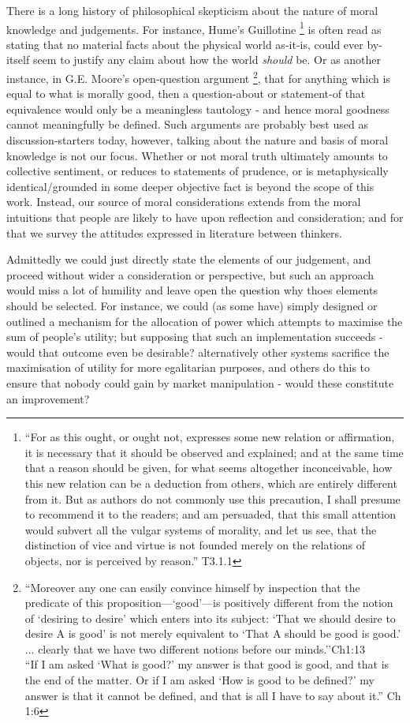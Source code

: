 \documentclass{article}
\begin{document}
There is a long history of philosophical skepticism about the nature of moral knowledge and judgements.
For instance, Hume's Guillotine \cite{HumeGutenberg}\footnote{``For as this ought, or ought not, expresses some new relation or affirmation, it is necessary that it should be observed and explained; and at the same time that a reason should be given, for what seems altogether inconceivable, how this new relation can be a deduction from others, which are entirely different from it. But as authors do not commonly use this precaution, I shall presume to recommend it to the readers; and am persuaded, that this small attention would subvert all the vulgar systems of morality, and let us see, that the distinction of vice and virtue is not founded merely on the relations of objects, nor is perceived by reason.'' T3.1.1} is often read as stating that no material facts about the physical world as-it-is, could ever by-itself seem to justify any claim about how the world \textit{should} be.
Or as another instance, in G.E. Moore's open-question argument \cite{MooreGutenberg}\footnote{
``Moreover any one can easily convince himself by inspection that the predicate of this proposition—`good'—is positively different from the notion of ‘desiring to desire' which enters into its subject: `That we should desire to desire A is good’ is not merely equivalent to `That A should be good is good.' ... clearly that we have two different notions before our minds.''Ch1:13\\
``If I am asked ‘What is good?’ my answer is that good is good, and that is the end of the matter. Or if I am asked ‘How is good to be defined?’ my answer is that it cannot be defined, and that is all I have to say about it.'' Ch 1:6}, that for anything which is equal to what is morally good, then a question-about or statement-of that equivalence would only be a meaningless tautology - and hence moral goodness cannot meaningfully be defined.
Such arguments are probably best used as discussion-starters today, however, talking about the nature and basis of moral knowledge is not our focus.
Whether or not moral truth ultimately amounts to collective sentiment, or reduces to  statements of prudence, or is metaphysically identical/grounded in some deeper objective fact is beyond the scope of this work.
Instead, our source of moral considerations extends from the moral intuitions that people are likely to have upon reflection and consideration; and for that we survey the attitudes expressed in literature between thinkers.

Admittedly we could just directly state the elements of our judgement, and proceed without wider a consideration or perspective, but such an approach would miss a lot of humility and leave open the question why thoes elements should be selected.
For instance, we could (as some have) simply designed or outlined a mechanism for the allocation of power which attempts to maximise the sum of people's utility; but supposing that such an implementation succeeds - would that outcome even be desirable?
alternatively other systems sacrifice the maximisation of utility for more egalitarian purposes, and others do this to ensure that nobody could gain by market manipulation - would these constitute an improvement?
\end{document}
